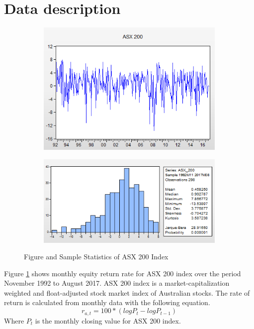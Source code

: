 \documentclass[11pt]{article}
\begin{document}
\section{Data description}
\begin{figure}[H]
	\centering
	\begin{subfigure}[t]{0.45\textwidth}
		\centering	
		\includegraphics[width=\textwidth]{asx200.png}
	\end{subfigure}
	\hfill
	\begin{subfigure}[t]{0.45\textwidth}
		\centering
		\includegraphics[width=\textwidth]{asx_sample_stats.png}
	\end{subfigure}
	\caption{Figure and Sample Statistics of ASX 200 Index}
	\label{data}
\end{figure}
Figure \ref{data} shows monthly equity return rate for ASX 200 index over the period November 1992 to August 2017. ASX 200 index is a market-capitalization weighted and float-adjusted stock market index of Australian stocks. The rate of return is calculated from monthly data with the following equation.
\[ r_{a,t} = 100 * (logP_t - logP_{t-1}) \]
Where $P_t$ is the monthly closing value for ASX 200 index.
\end{document}
